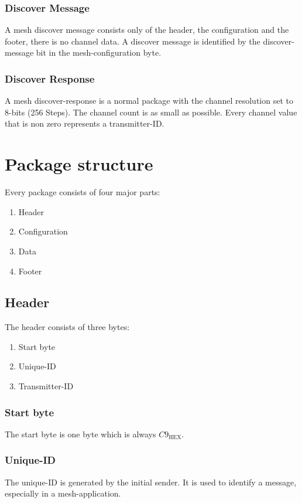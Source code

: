 \documentclass{scrreprt}
\begin{document}
\subsubsection{Discover Message}
A mesh discover message consists only of the header, the configuration and the footer, there is no
channel data. A discover message is identified by the discover-message bit in the mesh-configuration byte.

\subsubsection{Discover Response}
A mesh discover-response is a normal package with the channel resolution set to 8-bits (256 Steps). The channel count is as small as possible. Every channel value that is non zero represents
a transmitter-ID.

\section{Package structure}
Every package consists of four major parts:
\begin{enumerate}
  \item Header
  \item Configuration
  \item Data
  \item Footer
\end{enumerate}

\subsection{Header}
The header consists of three bytes:
\begin{enumerate}
  \item Start byte
  \item Unique-ID
  \item Transmitter-ID
\end{enumerate}

\subsubsection{Start byte}
The start byte is one byte which is always ${C9}_\text{HEX}$.

\subsubsection{Unique-ID}
 The unique-ID is generated by the initial sender. It is used to identify a
 message, especially in a mesh-application.
\end{document}
